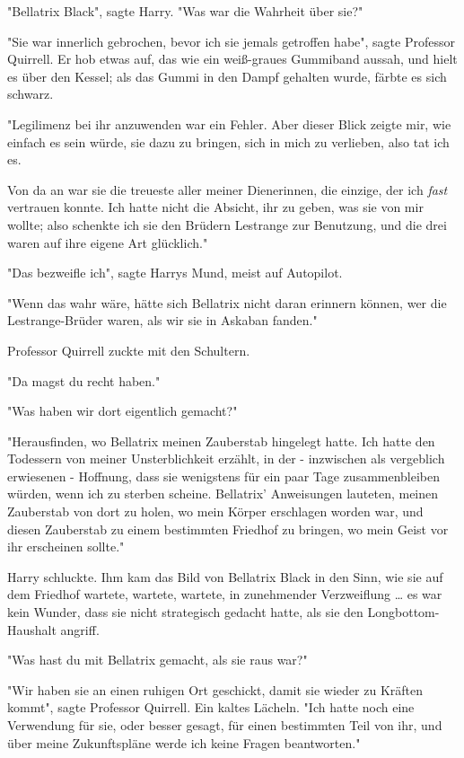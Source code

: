 {"Bellatrix Black", sagte Harry. "Was war die Wahrheit über sie?"

"Sie war innerlich gebrochen, bevor ich sie jemals getroffen habe", sagte Professor Quirrell. Er hob etwas auf, das wie ein weiß-graues Gummiband aussah, und hielt es über den Kessel; als das Gummi in den Dampf gehalten wurde, färbte es sich schwarz.

"Legilimenz bei ihr anzuwenden war ein Fehler. Aber dieser Blick zeigte mir, wie einfach es sein würde, sie dazu zu bringen, sich in mich zu verlieben, also tat ich es.

Von da an war sie die treueste aller meiner Dienerinnen, die einzige, der ich \emph{fast} vertrauen konnte. Ich hatte nicht die Absicht, ihr zu geben, was sie von mir wollte; also schenkte ich sie den Brüdern Lestrange zur Benutzung, und die drei waren auf ihre eigene Art glücklich."

"Das bezweifle ich", sagte Harrys Mund, meist auf Autopilot.

"Wenn das wahr wäre, hätte sich Bellatrix nicht daran erinnern können, wer die Lestrange-Brüder waren, als wir sie in Askaban fanden."

Professor Quirrell zuckte mit den Schultern.

"Da magst du recht haben."

"Was haben wir dort eigentlich gemacht?"

"Herausfinden, wo Bellatrix meinen Zauberstab hingelegt hatte. Ich hatte den Todessern von meiner Unsterblichkeit erzählt, in der - inzwischen als vergeblich erwiesenen - Hoffnung, dass sie wenigstens für ein paar Tage zusammenbleiben würden, wenn ich zu sterben scheine. Bellatrix' Anweisungen lauteten, meinen Zauberstab von dort zu holen, wo mein Körper erschlagen worden war, und diesen Zauberstab zu einem bestimmten Friedhof zu bringen, wo mein Geist vor ihr erscheinen sollte."

Harry schluckte. Ihm kam das Bild von Bellatrix Black in den Sinn, wie sie auf dem Friedhof wartete, wartete, wartete, in zunehmender Verzweiflung … es war kein Wunder, dass sie nicht strategisch gedacht hatte, als sie den Longbottom-Haushalt angriff.

"Was hast du mit Bellatrix gemacht, als sie raus war?"

"Wir haben sie an einen ruhigen Ort geschickt, damit sie wieder zu Kräften kommt", sagte Professor Quirrell. Ein kaltes Lächeln. "Ich hatte noch eine Verwendung für sie, oder besser gesagt, für einen bestimmten Teil von ihr, und über meine Zukunftspläne werde ich keine Fragen beantworten."

}
